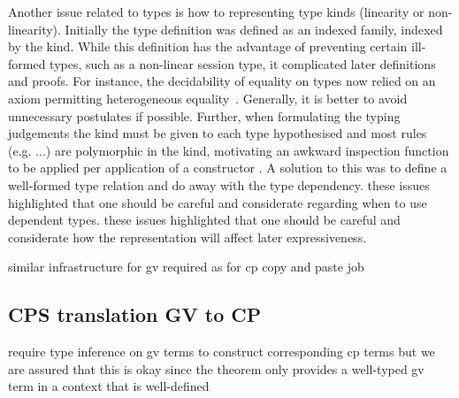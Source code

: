 Another issue related to types is how to representing type kinds (linearity or
non-linearity). Initially the type definition was defined as an indexed
family, indexed by the kind. While this definition has the advantage of
preventing certain ill-formed types, such as a non-linear session type, it
complicated later definitions and proofs. For instance, the decidability of
equality on types now relied on an axiom permitting heterogeneous
equality~\cite{??}. Generally, it is better to avoid unnecessary postulates if
possible. Further, when formulating the typing judgements the kind must be
given to each type hypothesised and most rules (e.g. ...) are polymorphic in
the kind, motivating an awkward inspection function to be applied per
application of a constructor . A solution to
this was to define a well-formed type relation and do away with the type
dependency. these issues highlighted that one should be careful and
considerate regarding when to use dependent types. these issues highlighted
that one should be careful and considerate how the representation will affect
later expressiveness.

similar infrastructure for gv required as for cp copy and paste job

\subsection{CPS translation GV to CP}

require type inference on gv terms to construct corresponding cp terms but we
are assured that this is okay since the theorem only provides a well-typed gv
term in a context that is well-defined

